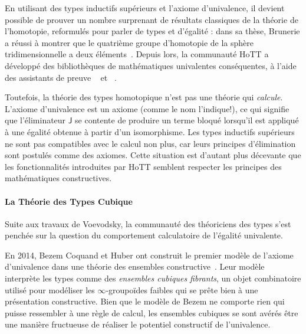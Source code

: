 En utilisant des types inductifs supérieurs et l'axiome d'univalence, il devient
possible de prouver un nombre surprenant de résultats classiques de la théorie 
de l'homotopie, reformulés pour parler de types et d'égalité : 
% 
dans sa thèse, Brunerie a réussi à montrer que le quatrième groupe d'homotopie 
de la sphère tridimensionnelle a deux éléments~. 
% 
Depuis lors, la communauté HoTT a développé des bibliothèques de 
mathématiques univalentes conséquentes, à l'aide des assistants de preuve
\Coq~ et \Agda~.

Toutefois, la théorie des types homotopique n'est pas une théorie qui 
\emph{calcule}. L'axiome d'univalence est un axiome (comme le nom l'indique!), 
ce qui signifie que l'éliminateur \( \mathsf{J} \) se contente de produire un 
terme bloqué lorsqu'il est appliqué à une égalité obtenue à partir d'un 
isomorphisme. 
% 
Les types inductifs supérieurs ne sont pas compatibles avec le calcul non plus, 
car leurs principes d'élimination sont postulés comme des axiomes. 
% 
Cette situation est d'autant plus décevante que les fonctionnalités introduites 
par HoTT semblent respecter les principes des mathématiques constructives.

\paragraph*{La Théorie des Types Cubique}
% 
Suite aux travaux de Voevodsky, la communauté des théoriciens des types
s'est penchée sur la question du comportement calculatoire de l'égalité 
univalente.

En 2014, Bezem Coquand et Huber ont construit le premier modèle de l'axiome d'univalence 
dans une théorie des ensembles constructive~.
% 
Leur modèle interprète les types comme des \emph{ensembles cubiques fibrants}, un 
objet combinatoire utilisé pour modéliser les \( \infty \)-groupoïdes faibles qui se prête 
bien à une présentation constructive. 
% 
Bien que le modèle de Bezem \etal ne comporte rien qui puisse ressembler à une 
règle de calcul, les ensembles cubiques se sont avérés être une manière fructueuse
de réaliser le potentiel constructif de l'univalence.


